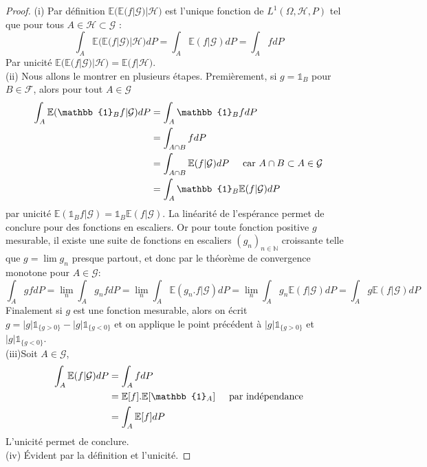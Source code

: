 \documentclass[12pt]{article}
\theoremstyle{definition}
\begin{document}
\begin{proof}
	(i) Par définition $\mathbb{E}\Big(\mathbb{E}(f|\mathcal{G})|\mathcal{H}\Big)$ est l'unique fonction de $L^1(\Omega,\mathcal{H},P)$ tel que pour tous $A\in\mathcal{H}\subset\mathcal{G}$ :
	\begin{equation*}
		\int_{A}\mathbb{E}\Big(\mathbb{E}(f|\mathcal{G})|\mathcal{H}\Big)dP = \int_{A}\mathbb{E}(f|\mathcal{G})dP= \int_{A}f dP
	\end{equation*}
	Par unicité $\mathbb{E}\Big(\mathbb{E}(f|\mathcal{G})|\mathcal{H}\Big)=\mathbb{E}\Big(f|\mathcal{H}\Big)$.\\
	(ii) Nous allons le montrer en plusieurs étapes. Premièrement, si $g=\mathbb{1}_{B}$ pour $B\in\mathcal{F}$, alors pour tout $A\in \mathcal{G}$ 
	\begin{align*}
		\int_{A}\mathbb{E}(\mathbb{1}_{B}f|\mathcal{G})dP&=\int_A \mathbb{1}_B f dP\\
		&=\int_{A\cap B} f dP\\
		&=\int_{A\cap B} \mathbb{E}(f|\mathcal{G})dP \hspace{5mm} \text{car $A\cap B \subset A\in\mathcal{G}$}\\
		&=\int_{A} \mathbb{1}_B \mathbb{E}(f|\mathcal{G})dP\\
	\end{align*}
	par unicité $\mathbb{E}(\mathbb{1}_{B}f|\mathcal{G}) = \mathbb{1}_B \mathbb{E}(f|\mathcal{G})$. La linéarité de l'espérance  permet de conclure pour des fonctions en escaliers. Or pour toute fonction positive $g$ mesurable, il existe une suite de fonctions en escaliers $(g_n)_{n\in\mathbb{N}}$ croissante telle que $g=\lim g_n$ presque partout, et donc par le théorème de convergence monotone pour $A\in\mathcal{G}$:
	\begin{equation*}
		\int_{A}gfdP=\lim_{n}\int_{A}g_nfdP=\lim_{n}\int_{A}\mathbb{E}(g_n.f|\mathcal{G})dP=\lim_{n}\int_{A}g_n\mathbb{E}(f|\mathcal{G}) dP =\int_{A}g\mathbb{E}(f|\mathcal{G})dP
	\end{equation*}
	Finalement si $g$ est une fonction mesurable, alors on écrit $g = |g|\mathbb{1}_{\big\{g>0\big\}}-|g|\mathbb{1}_{\big\{g<0\big\}}$ et on applique le point précédent à $|g|\mathbb{1}_{\big\{g>0\big\}}$ et $|g|\mathbb{1}_{\big\{g<0\big\}}$.\\
	(iii)Soit $A\in \mathcal{G}$, 
	\begin{align*}
		\int_{A}\mathbb{E}(f|\mathcal{G})dP &= \int_{A}f dP\\
		&=\mathbb{E}[f]. \mathbb{E}[\mathbb{1}_{A}]\hspace{5mm}\text{par indépendance}\\
		&=\int_A \mathbb{E}[f] dP
	\end{align*}
	L'unicité permet de conclure.\\
	(iv)  Évident par la définition et l'unicité.
	\end{proof}
\end{document}
